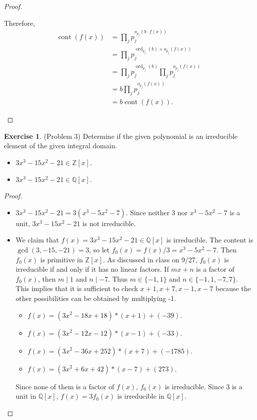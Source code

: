 \documentclass[12pt, psamsfonts]{amsart}
\theoremstyle{definition}
\newtheorem*{exer}{Exercise}
\theoremstyle{remark}
\DeclareMathOperator{\cont}{cont}
\DeclareMathOperator{\ord}{ord}
\numberwithin{equation}{section}
\begin{document}
\begin{proof}
\begin{itemize}
      Therefore, 
      \begin{align*}
        \cont(f(x))
          &= \prod_{j} p_j^{o_{p_j}(b \cdot f(x))} \\
          &= \prod_{j} p_j^{\ord_{p_j}(b) + o_{p_j}(f(x))} \\
          &= \prod_{j} p_j^{\ord_{p_j}(b)} \prod_j p_j^{o_{p_j}(f(x))} \\
          &= b\prod_j p_j^{o_{p_j}(f(x))} \\
          &= b\cont(f(x)).
      \end{align*}
  \end{itemize}
\end{proof}

\begin{exer}{(Problem 3)}
  Determine if the given polynomial is an irreducible element of the given integral domain.
  \begin{itemize}
    \item
      $3x^3 - 15x^2 - 21 \in \mathbb{Z}[x]$.
    \item
      $3x^3 - 15x^2 - 21 \in \mathbb{Q}[x]$.
  \end{itemize}
\end{exer}

\begin{proof}
  $ $
  \begin{itemize}
    \item
      $3x^3 - 15x^2 - 21 = 3(x^3 - 5x^2 - 7)$.
      Since neither 3 nor $x^3 - 5x^2 - 7$ is a unit, $3x^3 - 15x^2 - 21$ is not irreducible.
    \item
      We claim that $f(x) = 3x^3 - 15x^2 - 21 \in \mathbb{Q}[x]$ is irreducible.
      The content is $\gcd(3, -15, -21) = 3$, so let $f_0(x) = f(x) / 3 = x^3 - 5x^2 - 7$.
      Then $f_0(x)$ is primitive in $\mathbb{Z}[x]$.
      As discussed in class on 9/27, $f_0(x)$ is irreducible if and only if it has no linear factors.
      If $mx + n$ is a factor of $f_0(x)$, then $m \mid 1$ and $n \mid -7$.
      Thus $m \in \{ -1, 1 \}$ and $n \in \{ -1, 1, -7, 7 \}$.
      This implies that it is sufficient to check $x + 1, x + 7, x - 1, x - 7$ because the other possibilities can be obtained by multiplying -1.

      \begin{itemize}
        \item
          $f(x) = (3 x^{2} - 18 x + 18) * (x + 1) + (-39)$.
        \item
          $f(x) = (3 x^{2} - 12 x - 12) * (x - 1) + (-33)$.
        \item
          $f(x) = (3 x^{2} - 36 x + 252) * (x + 7) + (-1785)$.
        \item
          $f(x) = (3 x^{2} + 6 x + 42) * (x - 7) + (273)$.
      \end{itemize}

      Since none of them is a factor of $f(x)$, $f_0(x)$ is irreducible.
      Since $3$ is a unit in $\mathbb{Q}[x]$, $f(x) = 3f_0(x)$ is irreducible in $\mathbb{Q}[x]$.
  \end{itemize}
\end{proof}
\end{document}
